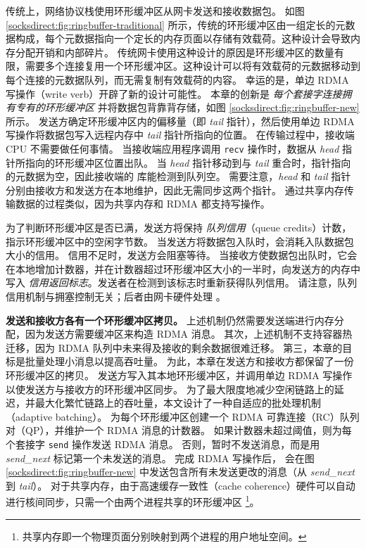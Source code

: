 传统上，网络协议栈使用环形缓冲区从网卡发送和接收数据包。
如图 \ref {socksdirect:fig:ringbuffer-traditional} 所示，传统的环形缓冲区由一组定长的元数据构成，每个元数据指向一个定长的内存页面以存储有效载荷。这种设计会导致内存分配开销和内部碎片。
传统网卡使用这种设计的原因是环形缓冲区的数量有限，需要多个连接复用一个环形缓冲区。这种设计可以将有效载荷的元数据移动到每个连接的元数据队列，而无需复制有效载荷的内容。
幸运的是，单边 RDMA 写操作（write verb）开辟了新的设计可能性。
本章的创新是 \emph {每个套接字连接拥有专有的环形缓冲区} 并将数据包背靠背存储，如图 \ref {socksdirect:fig:ringbuffer-new} 所示。
发送方确定环形缓冲区内的偏移量（即 \emph{tail} 指针），然后使用单边 RDMA 写操作将数据包写入远程内存中 \emph{tail} 指针所指向的位置。
在传输过程中，接收端 CPU 不需要做任何事情。
当接收端应用程序调用 \texttt {recv} 操作时，数据从 \emph {head} 指针所指向的环形缓冲区位置出队。
当 \emph{head} 指针移动到与 \emph{tail} 重合时，指针指向的元数据为空，因此接收端的 \libipc{} 库能检测到队列空。
需要注意，\emph{head} 和 \emph{tail} 指针分别由接收方和发送方在本地维护，因此无需同步这两个指针。
通过共享内存传输数据的过程类似，因为共享内存和 RDMA 都支持写操作。

为了判断环形缓冲区是否已满，发送方将保持 \textit {队列信用}（queue credits）计数，指示环形缓冲区中的空闲字节数。
当发送方将数据包入队时，会消耗入队数据包大小的信用。
信用不足时，发送方会阻塞等待。
当接收方使数据包出队时，它会在本地增加计数器，并在计数器超过环形缓冲区大小的一半时，向发送方的内存中写入 \textit {信用返回标志}。发送者在检测到该标志时重新获得队列信用。
请注意，队列信用机制与拥塞控制无关；后者由网卡硬件处理 \cite {zhu2015congestion}。

\textbf {发送和接收方各有一个环形缓冲区拷贝。}
上述机制仍然需要发送端进行内存分配，因为发送方需要缓冲区来构造 RDMA 消息。
其次，上述机制不支持容器热迁移，因为 RDMA 队列中未来得及接收的剩余数据很难迁移。
第三，本章的目标是批量处理小消息以提高吞吐量。
为此，本章在发送方和接收方都保留了一份环形缓冲区的拷贝。
发送方写入其本地环形缓冲区，并调用单边 RDMA 写操作以使发送方与接收方的环形缓冲区同步。
为了最大限度地减少空闲链路上的延迟，并最大化繁忙链路上的吞吐量，本文设计了一种自适应的批处理机制（adaptive batching）。
\libipc{} 为每个环形缓冲区创建一个 RDMA 可靠连接（RC）队列对（QP），并维护一个 RDMA 消息的计数器。
如果计数器未超过阈值，则为每个套接字 \texttt {send} 操作发送 RDMA 消息。
否则，暂时不发送消息，而是用 \emph {send\_next} 标记第一个未发送的消息。
完成 RDMA 写操作后，\libipc{} 会在图 \ref {socksdirect:fig:ringbuffer-new} 中发送包含所有未发送更改的消息（从 \emph {send\_next} 到 \emph {tail}）。
对于共享内存，由于高速缓存一致性（cache coherence）硬件可以自动进行核间同步，只需一个由两个进程共享的环形缓冲区 \footnote{共享内存即一个物理页面分别映射到两个进程的用户地址空间。}。

